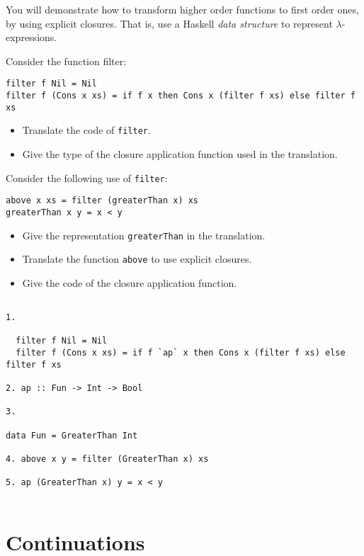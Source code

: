 \documentclass{article}
\newcommand{\answer}[1]{}
\begin{document}
{You will demonstrate how to transform higher order functions to first order ones,
by using explicit closures.  That is, use a Haskell \emph{data
  structure} to represent $\lambda$-expressions.

Consider the function filter:
\begin{verbatim}
filter f Nil = Nil
filter f (Cons x xs) = if f x then Cons x (filter f xs) else filter f xs
\end{verbatim}

\begin{itemize}
\item Translate the code of \texttt{filter}. 
\item Give the type of the closure application function used in the
  translation. 
\end{itemize}

Consider the following use of \texttt{filter}:
\begin{verbatim}
above x xs = filter (greaterThan x) xs
greaterThan x y = x < y
\end{verbatim}

\begin{itemize}
\item Give the representation \texttt{greaterThan} in the translation. 
\item Translate the function \texttt{above} to use explicit closures. 
\item Give the code of the closure application function. 
\end{itemize}

\answer{}{
  \begin{verbatim}
    
1.

  filter f Nil = Nil
  filter f (Cons x xs) = if f `ap` x then Cons x (filter f xs) else filter f xs

2. ap :: Fun -> Int -> Bool

3. 

data Fun = GreaterThan Int 

4. above x y = filter (GreaterThan x) xs

5. ap (GreaterThan x) y = x < y
 
  \end{verbatim}
}

\section{Continuations}

}
\end{document}
